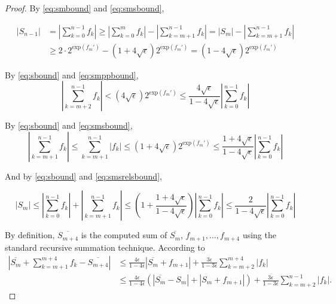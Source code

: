 \documentclass[12pt]{article}
\providecommand{\exp}{\ensuremath{\text{exp}}}
\theoremstyle{definition}
\numberwithin{equation}{section}
\numberwithin{figure}{section}
\begin{document}
\begin{proof}
      By  \eqref{eq:smbound} and \eqref{eq:smsbound},

      \begin{align}
        |S_{n-1}| & = |\sum\limits_{k = 0}^{n - 1} f_k| \geq |\sum\limits_{k = 0}^{m} f_k| - |\sum\limits_{k = m + 1}^{n - 1} f_k| = |S_m| - |\sum\limits_{k = m + 1}^{n - 1} f_k| \nonumber \\
        & \geq 2 \cdot 2^{\exp(f_{m}')} - (1 + 4 \sqrt\epsilon) 2^{\exp(f_m')} = (1 - 4 \sqrt\epsilon) 2^{\exp(f_m')}
        \label{eq:sbound}
      \end{align}

      By  \eqref{eq:sbound} and \eqref{eq:smppbound},
      \begin{equation}
        |\sum \limits_{k = m + 2}^{n - 1} f_k| < (4 \sqrt{\epsilon}) 2^{\exp(f_m')} \leq \frac{4 \sqrt\epsilon}{1 - 4  \sqrt\epsilon}|\sum\limits_{k = 0}^{n - 1}f_k|
        \label{eq:smpprelsbound}
      \end{equation}

      By  \eqref{eq:sbound} and \eqref{eq:smsbound},
      \begin{equation}
        |\sum\limits_{k = m + 1}^{n - 1}f_k| \leq \sum\limits_{k = m + 1}^{n - 1}|f_k| \leq (1 + 4  \sqrt\epsilon)2^{\exp(f_m')}\leq \frac{1 + 4  \sqrt\epsilon}{1 - 4  \sqrt\epsilon}|\sum\limits_{k = 0}^{n - 1}f_k|
        \label{eq:smsrelsbound}
      \end{equation}

      And by \eqref{eq:sbound} and \eqref{eq:smsrelsbound},

      \begin{equation}
        |S_m| \leq |\sum\limits_{k = 0}^{n - 1}f_k| + |\sum\limits_{k = m + 1}^{n - 1} f_k| \leq (1 + \frac{1 + 4  \sqrt\epsilon}{1 - 4  \sqrt\epsilon})|\sum\limits_{k = 0}^{n - 1}f_k| \leq \frac{2}{1 - 4  \sqrt\epsilon}|\sum\limits_{k = 0}^{n - 1}f_k|
        \label{eq:smrelsbound}
      \end{equation}

    By definition, $\overline{S_{m+4}}$ is the computed sum of
    $\overline{S_m}$, $f_{m+1}, \ldots, f_{m+4}$ using the standard recursive summation technique.
    According to \cite[Equation 1.2, 2.4]{higham}
    \begin{align*}
        |\overline{S_m} + \sum_{k=m+1}^{m+4}f_k - \overline{S_{m+4}}|
        & \leq \frac{4\epsilon}{1-4\epsilon} |\overline{S_m} + f_{m+1}| + \frac{3\epsilon}{1-3\epsilon} \sum_{k=m+2}^{m+4}|f_k| \\
        & \leq \frac{4\epsilon}{1-4\epsilon} (|\overline{S_m} - S_m| + |S_m + f_{m+1}|)
            + \frac{3\epsilon}{1-3\epsilon} \sum_{k=m+2}^{n-1}|f_k|.
    \end{align*}


\end{proof}
\end{document}
